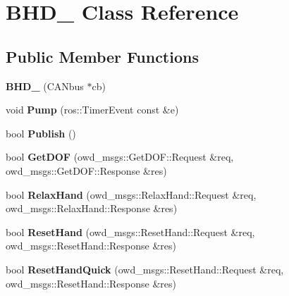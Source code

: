 \hypertarget{classBHD__280}{\section{B\-H\-D\-\_ Class Reference}
\label{classBHD__280}
}
\subsection*{Public Member Functions}
\begin{DoxyCompactItemize}
\item 
\hypertarget{classBHD__280_a8ad8055a011262a3ca8ed61bd87d0322}{{\bfseries B\-H\-D\-\_} (C\-A\-Nbus $\ast$cb)}\label{classBHD__280_a8ad8055a011262a3ca8ed61bd87d0322}

\item 
\hypertarget{classBHD__280_a81f2a72b36efdba5d66ee1ddbc03e210}{void {\bfseries Pump} (ros\-::\-Timer\-Event const \&e)}\label{classBHD__280_a81f2a72b36efdba5d66ee1ddbc03e210}

\item 
\hypertarget{classBHD__280_a6c662037d2db8dc16f863d27b024251e}{bool {\bfseries Publish} ()}\label{classBHD__280_a6c662037d2db8dc16f863d27b024251e}

\item 
\hypertarget{classBHD__280_aa0cd619b4b032f85ae7acf9ccecb0f2e}{bool {\bfseries Get\-D\-O\-F} (owd\-\_\-msgs\-::\-Get\-D\-O\-F\-::\-Request \&req, owd\-\_\-msgs\-::\-Get\-D\-O\-F\-::\-Response \&res)}\label{classBHD__280_aa0cd619b4b032f85ae7acf9ccecb0f2e}

\item 
\hypertarget{classBHD__280_a17893df77b879f87b12b055085e949ec}{bool {\bfseries Relax\-Hand} (owd\-\_\-msgs\-::\-Relax\-Hand\-::\-Request \&req, owd\-\_\-msgs\-::\-Relax\-Hand\-::\-Response \&res)}\label{classBHD__280_a17893df77b879f87b12b055085e949ec}

\item 
\hypertarget{classBHD__280_afe09d5a5633c621cfde8bff26c848876}{bool {\bfseries Reset\-Hand} (owd\-\_\-msgs\-::\-Reset\-Hand\-::\-Request \&req, owd\-\_\-msgs\-::\-Reset\-Hand\-::\-Response \&res)}\label{classBHD__280_afe09d5a5633c621cfde8bff26c848876}

\item 
\hypertarget{classBHD__280_a6868633c8705cabab9cfef0d8dc2a1a5}{bool {\bfseries Reset\-Hand\-Quick} (owd\-\_\-msgs\-::\-Reset\-Hand\-::\-Request \&req, owd\-\_\-msgs\-::\-Reset\-Hand\-::\-Response \&res)}\label{classBHD__280_a6868633c8705cabab9cfef0d8dc2a1a5}


\end{DoxyCompactItemize}
